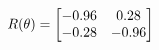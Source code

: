 \documentclass[preview]{standalone}
\begin{document}
\begin{align*}
\special{dvisvgm:raw <g id='unique000'>}R(\theta) = \begin{bmatrix}-0.96 & 0.28\\-0.28 & -0.96\end{bmatrix}\special{dvisvgm:raw </g>}
\end{align*}
\end{document}
